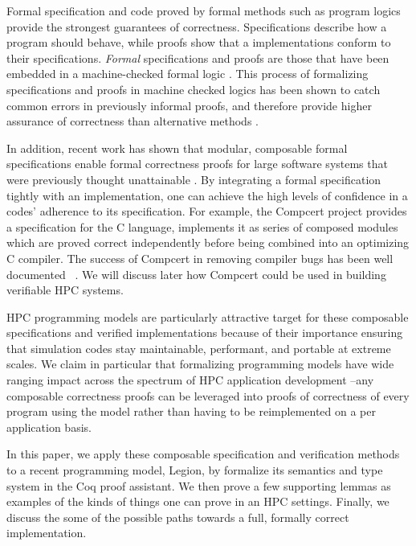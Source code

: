 \documentclass[sigconf]{acmart}
\begin{document}
Formal specification and code proved by formal methods such as program logics
provide the strongest guarantees of correctness. Specifications describe how
a program should behave, while proofs show that a implementations conform to
their specifications. \emph{Formal} specifications and proofs are those that
have been embedded in a machine-checked formal logic
\cite{bertot2013interactive, nipkow2002isabelle, pfenning1999system,
jackson1994nuprl}. This process of formalizing specifications and proofs in
machine checked logics has been shown to catch common errors in previously
informal proofs, and therefore provide higher assurance of correctness than
alternative methods \cite{clarke1996formal, yang2011finding}.

In addition, recent work has shown that modular, composable formal
specifications enable formal correctness proofs for large software systems that
were previously thought unattainable \cite{weng2016deepspec}. By integrating a
formal specification tightly with an implementation, one can achieve the high
levels of confidence in a codes' adherence to its
specification\cite{weng2016deepspec}. For example, the Compcert project
provides a specification for the C language, implements it as series of
composed modules which are proved correct independently before being combined
into an optimizing C compiler. The success of Compcert in removing compiler
bugs has been well documented ~\cite{leroy2012compcert}. We will discuss later
how Compcert could be used in building verifiable HPC systems.

HPC programming models are particularly attractive target for these composable
specifications and verified implementations because of their importance 
ensuring that simulation codes stay maintainable, performant, and portable at
extreme scales\cite{diaz2012survey}.  We claim in particular that formalizing
programming models have wide ranging impact across the spectrum of HPC
application development --any composable correctness proofs can be leveraged
into proofs of correctness of every program using the model rather than having
to be reimplemented on a per application basis.

In this paper, we apply these composable specification and verification methods
to a recent programming model, Legion, by formalize its semantics and type
system in the Coq proof assistant. We then prove a few supporting lemmas as
examples of the kinds of things one can prove in an HPC settings. Finally, we
discuss the some of the possible paths towards a full, formally correct
implementation.
\end{document}
